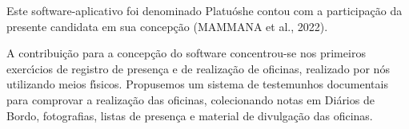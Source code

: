 \documentclass[
12pt,		%
openright,	%
twoside,  %
a4paper,			%
chapter=TITLE,		%
english,			%
french,				%
spanish,			%
brazil				%
]{USPSC-classe/USPSC}
\begin{document}
Este software-aplicativo foi denominado \textquotedbl Platu\'osh\textquotedbl  e contou com a participa\c{c}\~ao da presente candidata em sua concep\c{c}\~ao  (MAMMANA et al., 2022).




A contribui\c{c}\~ao para a concep\c{c}\~ao do software concentrou-se nos primeiros exerc\'{\i}cios de registro de presen\c{c}a e de realiza\c{c}\~ao de oficinas, realizado por n\'os utilizando meios f\'{\i}sicos. Propusemos um sistema de testemunhos documentais para comprovar a realiza\c{c}\~ao das oficinas, colecionando notas em Di\'arios de Bordo, fotografias, listas de presen\c{c}a e material de divulga\c{c}\~ao das oficinas.






\captionsetup{format=plain}
\begin{figure}[max size={\textwidth}{\textheight}]

\centering



\end{figure}
\end{document}
